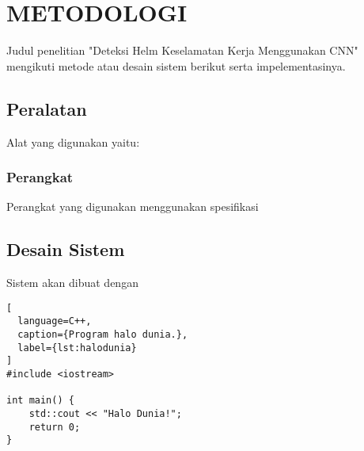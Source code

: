 \chapter{METODOLOGI}
\label{chap:metodologi}


Judul penelitian "Deteksi Helm Keselamatan Kerja Menggunakan CNN" mengikuti metode atau desain sistem berikut serta impelementasinya.


\section{Peralatan}
\label{sec:peralatan}

Alat yang digunakan yaitu: \lipsum[1]

\subsection{Perangkat}
\label{subsec:perangkat}

Perangkat yang digunakan menggunakan spesifikasi \lipsum[1]

\section{Desain Sistem}
\label{sec:desainsistem}

Sistem akan dibuat dengan \lipsum[1-2]



\begin{lstlisting}[
  language=C++,
  caption={Program halo dunia.},
  label={lst:halodunia}
]
#include <iostream>

int main() {
    std::cout << "Halo Dunia!";
    return 0;
}
\end{lstlisting}

\lipsum[2-3]



\lipsum[4]

